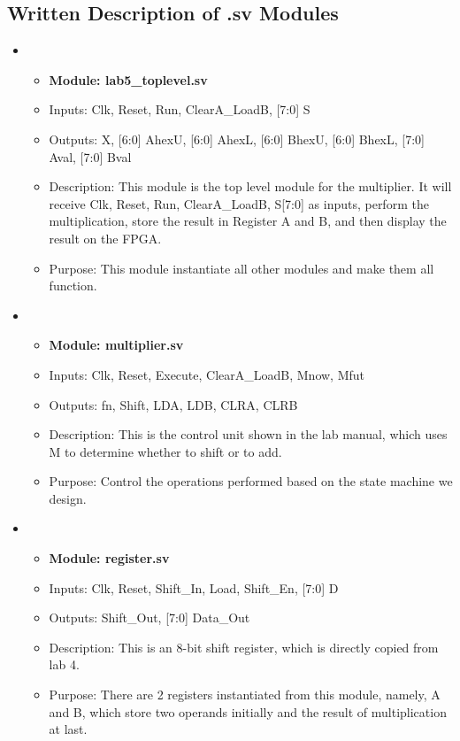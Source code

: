 \documentclass[11pt]{article}
\begin{document}
\subsection{Written Description of .sv Modules}
\begin{itemize}
    \item 
    \begin{itemize}
        \item \textbf{Module: lab5\_toplevel.sv}
        \item Inputs: Clk, Reset, Run, ClearA\_LoadB, [7:0] S
        \item Outputs: X, [6:0]	AhexU, [6:0]	AhexL, [6:0]	BhexU, [6:0]	BhexL, [7:0]	Aval, [7:0]	Bval
        \item Description: This module is the top level module for the multiplier. It will receive Clk, Reset, Run, ClearA\_LoadB, S[7:0] as inputs, perform the multiplication, store the result in Register A and B, and then display the result on the FPGA.
        \item Purpose: This module instantiate all other modules and make them all function.
    \end{itemize}

    \item
    \begin{itemize}
        \item \textbf{Module: multiplier.sv}
        \item Inputs: Clk, Reset, Execute, ClearA\_LoadB, Mnow, Mfut
        \item Outputs: fn, Shift, LDA, LDB, CLRA, CLRB
        \item Description: This is the control unit shown in the lab manual, which uses M to determine whether to shift or to add.
        \item Purpose: Control the operations performed based on the state machine we design.
    \end{itemize}

    \item
    \begin{itemize}
        \item \textbf{Module: register.sv}
        \item Inputs: Clk, Reset, Shift\_In, Load, Shift\_En, [7:0]  D
        \item Outputs: Shift\_Out, [7:0]  Data\_Out
        \item Description: This is an 8-bit shift register, which is directly copied from lab 4.
        \item Purpose: There are 2 registers instantiated from this module, namely, A and B, which store two operands initially and the result of multiplication at last.
    \end{itemize}


\end{itemize}
\end{document}
